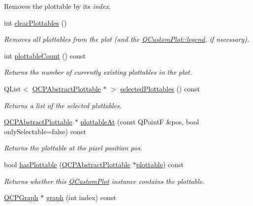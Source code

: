 \begin{DoxyCompactItemize}
\begin{DoxyCompactList}
Removes the plottable by its {\itshape index}. \end{DoxyCompactList}\item 
int \hyperlink{classQCustomPlot_a9a409bb3201878adb7ffba1c89c4e004}{clear\+Plottables} ()
\begin{DoxyCompactList}\small\item\em Removes all plottables from the plot (and the \hyperlink{classQCustomPlot_a4eadcd237dc6a09938b68b16877fa6af}{Q\+Custom\+Plot\+::legend}, if necessary). \end{DoxyCompactList}\item 
int \hyperlink{classQCustomPlot_a2dbfbf15dc38713f9a1c445a3dd2e989}{plottable\+Count} () const 
\begin{DoxyCompactList}\small\item\em Returns the number of currently existing plottables in the plot. \end{DoxyCompactList}\item 
Q\+List$<$ \hyperlink{classQCPAbstractPlottable}{Q\+C\+P\+Abstract\+Plottable} $\ast$ $>$ \hyperlink{classQCustomPlot_a6721b8c689bb7f2f400987e580508fe8}{selected\+Plottables} () const 
\begin{DoxyCompactList}\small\item\em Returns a list of the selected plottables. \end{DoxyCompactList}\item 
\hyperlink{classQCPAbstractPlottable}{Q\+C\+P\+Abstract\+Plottable} $\ast$ \hyperlink{classQCustomPlot_ac1d1bc6ae4e13616fb02cef6d9e2188e}{plottable\+At} (const Q\+Point\+F \&pos, bool only\+Selectable=false) const 
\begin{DoxyCompactList}\small\item\em Returns the plottable at the pixel position {\itshape pos}. \end{DoxyCompactList}\item 
bool \hyperlink{classQCustomPlot_a4fc28914e2ee91aab424b7ce46b6bdf1}{has\+Plottable} (\hyperlink{classQCPAbstractPlottable}{Q\+C\+P\+Abstract\+Plottable} $\ast$\hyperlink{classQCustomPlot_a32de81ff53e263e785b83b52ecd99d6f}{plottable}) const 
\begin{DoxyCompactList}\small\item\em Returns whether this \hyperlink{classQCustomPlot}{Q\+Custom\+Plot} instance contains the {\itshape plottable}. \end{DoxyCompactList}\item 
\hyperlink{classQCPGraph}{Q\+C\+P\+Graph} $\ast$ \hyperlink{classQCustomPlot_a6d3ed93c2bf46ab7fa670d66be4cddaf}{graph} (int index) const 

\end{DoxyCompactItemize}
